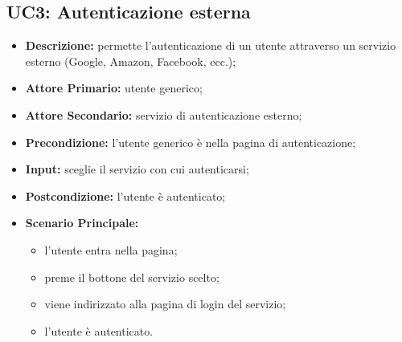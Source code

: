 \subsection{UC3: Autenticazione esterna}
\label{sec:UC3}
\begin{itemize}
    \item \textbf{Descrizione:} permette l'autenticazione di un utente attraverso un servizio esterno (Google, Amazon, Facebook, ecc.);
    \item \textbf{Attore Primario:} utente generico;
    \item \textbf{Attore Secondario:} servizio di autenticazione esterno;
    \item \textbf{Precondizione:} l'utente generico è nella pagina di autenticazione;
    \item \textbf{Input:} sceglie il servizio con cui autenticarsi;
    \item \textbf{Postcondizione:} l'utente è autenticato;
    \item \textbf{Scenario Principale:}
          \begin{itemize}
              \item l'utente entra nella pagina;
              \item preme il bottone del servizio scelto;
              \item viene indirizzato alla pagina di login del servizio;
              \item l'utente è autenticato.
          \end{itemize}
\end{itemize}

